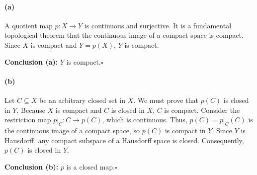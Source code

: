 
\paragraph{(a)}
A quotient map $p\colon X\to Y$ is continuous and surjective. It is a fundamental topological
theorem that the continuous image of a compact space is compact. Since $X$ is compact and
$Y=p(X)$, $Y$ is compact.

\textbf{Conclusion (a):} $Y$ is compact.\hfill$\square$

\paragraph{(b)}
Let $C\subseteq X$ be an arbitrary closed set in $X$. We must prove that $p(C)$ is closed in
$Y$. Because $X$ is compact and $C$ is closed in $X$, $C$ is compact. Consider the restriction
map $p|_C\colon C\to p(C)$, which is continuous. Thus, $p(C)=p|_C(C)$ is the continuous image of
a compact space, so $p(C)$ is compact in $Y$. Since $Y$ is Hausdorff, any compact subspace of a
Hausdorff space is closed. Consequently, $p(C)$ is closed in $Y$.

\textbf{Conclusion (b):} $p$ is a closed map.\hfill$\square$
